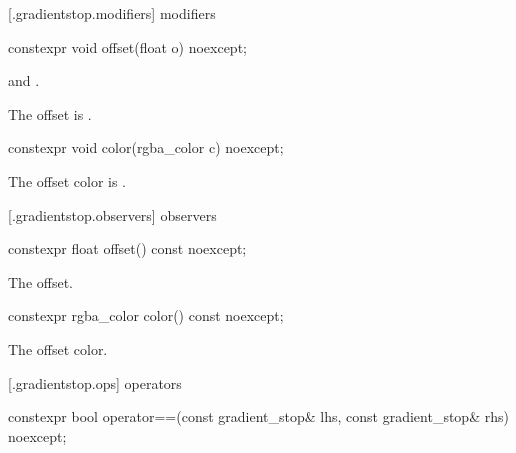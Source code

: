  [\iotwod.gradientstop.modifiers] { modifiers}

%
\begin{itemdecl}
constexpr void offset(float o) noexcept;
\end{itemdecl}
\begin{itemdescr}
\pnum
\requires
{} and .

\pnum
\effects
The offset is .
\end{itemdescr}

%
\begin{itemdecl}
constexpr void color(rgba_color c) noexcept;
\end{itemdecl}
\begin{itemdescr}
\pnum
\effects
The offset color is .
\end{itemdescr}

 [\iotwod.gradientstop.observers] { observers}

%
\begin{itemdecl}
constexpr float offset() const noexcept;
\end{itemdecl}
\begin{itemdescr}
\pnum
\returns
The offset.
\end{itemdescr}

%
\begin{itemdecl}
constexpr rgba_color color() const noexcept;
\end{itemdecl}
\begin{itemdescr}
\pnum
\returns
The offset color.
\end{itemdescr}

 [\iotwod.gradientstop.ops] { operators}

%
\begin{itemdecl}
constexpr bool operator==(const gradient_stop& lhs, const gradient_stop& rhs)
  noexcept;
\end{itemdecl}
\begin{itemdescr}
\pnum
\returns
{}
\end{itemdescr}
